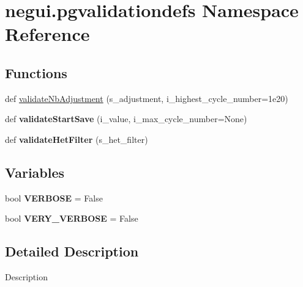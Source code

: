 \hypertarget{namespacenegui_1_1pgvalidationdefs}{}\section{negui.\+pgvalidationdefs Namespace Reference}
\label{namespacenegui_1_1pgvalidationdefs}
\subsection*{Functions}
\begin{DoxyCompactItemize}
\item 
def \hyperlink{namespacenegui_1_1pgvalidationdefs_a4b7d8191dc9d960485de54ff057da930}{validate\+Nb\+Adjustment} (s\+\_\+adjustment, i\+\_\+highest\+\_\+cycle\+\_\+number=1e20)
\item 
def {\bfseries validate\+Start\+Save} (i\+\_\+value, i\+\_\+max\+\_\+cycle\+\_\+number=None)\hypertarget{namespacenegui_1_1pgvalidationdefs_a1c9aaad56b10935c66e0204f0e0ac014}{}\label{namespacenegui_1_1pgvalidationdefs_a1c9aaad56b10935c66e0204f0e0ac014}

\item 
def {\bfseries validate\+Het\+Filter} (s\+\_\+het\+\_\+filter)\hypertarget{namespacenegui_1_1pgvalidationdefs_ab2d1f923cd9556fdb3f63bf637793829}{}\label{namespacenegui_1_1pgvalidationdefs_ab2d1f923cd9556fdb3f63bf637793829}

\end{DoxyCompactItemize}
\subsection*{Variables}
\begin{DoxyCompactItemize}
\item 
bool {\bfseries V\+E\+R\+B\+O\+SE} = False\hypertarget{namespacenegui_1_1pgvalidationdefs_a7f32dbaa7f0b8ef9c2695e6078398807}{}\label{namespacenegui_1_1pgvalidationdefs_a7f32dbaa7f0b8ef9c2695e6078398807}

\item 
bool {\bfseries V\+E\+R\+Y\+\_\+\+V\+E\+R\+B\+O\+SE} = False\hypertarget{namespacenegui_1_1pgvalidationdefs_ad0a217377cd82d9c2fa4942b94f35011}{}\label{namespacenegui_1_1pgvalidationdefs_ad0a217377cd82d9c2fa4942b94f35011}

\end{DoxyCompactItemize}


\subsection{Detailed Description}
\begin{DoxyVerb}Description
\end{DoxyVerb}
 

